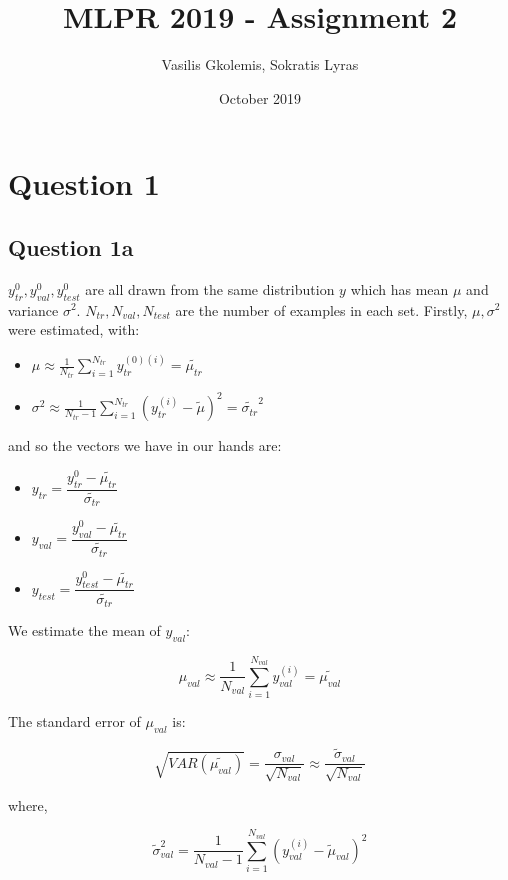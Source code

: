\documentclass{article}
\title{MLPR 2019 - Assignment 2}
\author{Vasilis Gkolemis, Sokratis Lyras}
\date{October 2019}
\begin{document}
\maketitle

\section{Question 1}
\subsection{Question 1a}

$y_{tr}^{0}, y_{val}^{0}, y_{test}^{0}$ are all drawn from the same distribution $y$ which has mean $\mu$ and variance $\sigma^2$. $N_{tr}, N_{val}, N_{test}$ are the number of examples in each set.
Firstly, $\mu, \sigma^2$ were estimated, with:
\begin{itemize}
    \item $\displaystyle \mu \approx \frac{1}{N_{tr}} \sum_{i=1}^{N_{tr}} y_{tr}^{(0)(i)} = \tilde{\mu_{tr}} $
    
    \item $\displaystyle \sigma^2 \approx \frac{1}{N_{tr}-1} \sum_{i=1}^{N_{tr}} (y_{tr}^{(i)} - \tilde{\mu})^2 = \tilde{\sigma_{tr}}^2$
\end{itemize}

and so the vectors we have in our hands are:

\begin{itemize}
    \item $y_{tr} = \dfrac{y_{tr}^{0} - \tilde{\mu_{tr}}}{\tilde{\sigma_{tr}}}$ 
    \item $y_{val} = \dfrac{y_{val}^{0} - \tilde{\mu_{tr}}}{\tilde{\sigma_{tr}}}$ 
    \item $y_{test} = \dfrac{y_{test}^{0} - \tilde{\mu_{tr}}}{\tilde{\sigma_{tr}}}$ 
\end{itemize}

We estimate the mean of $y_{val}$:

$$ \displaystyle \mu_{val} \approx \frac{1}{N_{val}} \sum_{i=1}^{N_{val}} y_{val}^{(i)} = \tilde{\mu_{val}} $$

The standard error of $\mu_{val}$ is:

$$ \sqrt{VAR(\tilde{\mu_{val}})} = 
\displaystyle \frac{\sigma_{val}}{\sqrt{N_{val}}} 
\approx \displaystyle \frac{\tilde{\sigma}_{val}}{\sqrt{N_{val}}}$$ 

where,

$$ \displaystyle \tilde{\sigma}_{val}^2 = \frac{1}{N_{val}-1} \sum_{i=1}^{N_{val}} (y_{val}^{(i)} - \tilde{\mu}_{val})^2 $$
\end{document}
